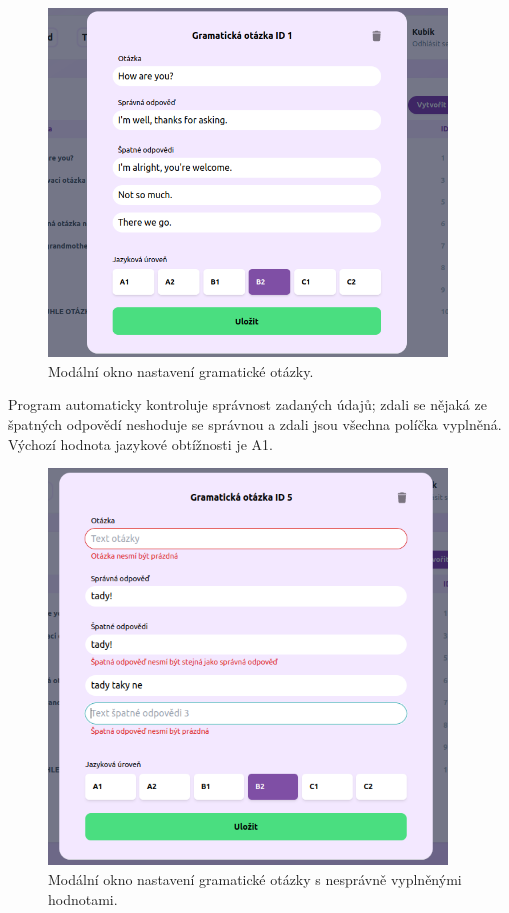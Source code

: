 \begin{figure}[H]
    \centering
    \includegraphics[width=400px]{images/01design/question.png}
    \caption{Modální okno nastavení gramatické otázky.}
    \label{questionfill}
\end{figure}

Program automaticky kontroluje správnost zadaných údajů; zdali se nějaká ze špatných odpovědí neshoduje se správnou a zdali jsou všechna políčka vyplněná. Výchozí hodnota jazykové obtížnosti je A1.

\begin{figure}[H]
    \centering
    \includegraphics[width=400px]{images/01design/question-bad.png}
    \caption{Modální okno nastavení gramatické otázky s nesprávně vyplněnými hodnotami.}
\end{figure}


